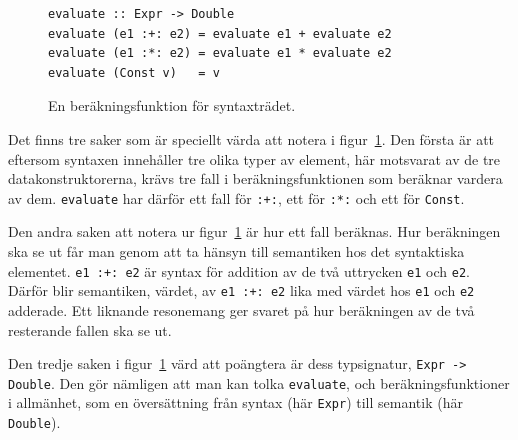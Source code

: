 \begin{draft}
\begin{figure}[tph]
  \begin{lstlisting}
evaluate :: Expr -> Double
evaluate (e1 :+: e2) = evaluate e1 + evaluate e2
evaluate (e1 :*: e2) = evaluate e1 * evaluate e2
evaluate (Const v)   = v
  \end{lstlisting}
  \caption{En beräkningsfunktion för syntaxträdet.}\label{fig:eval_tree}
\end{figure}

Det finns tre saker som är speciellt värda att notera i
figur~\ref{fig:eval_tree}. Den första är att eftersom syntaxen innehåller tre olika
typer av element, här motsvarat av de tre datakonstruktorerna, krävs tre fall i
beräkningsfunktionen som beräknar vardera av dem. \texttt{evaluate} har
därför ett fall för \texttt{:+:}, ett för \texttt{:*:} och ett för
\texttt{Const}. 

Den andra saken att notera ur figur~\ref{fig:eval_tree} är hur ett fall
beräknas. Hur beräkningen ska se ut får man genom att ta hänsyn till
semantiken hos det syntaktiska elementet. \texttt{e1 :+: e2} är syntax för
addition av de två uttrycken \texttt{e1} och \texttt{e2}. Därför blir
semantiken, värdet, av \texttt{e1 :+: e2} lika med värdet hos \texttt{e1} och
\texttt{e2} adderade. Ett liknande resonemang ger svaret på hur beräkningen av
de två resterande fallen ska se ut.

Den tredje saken i figur~\ref{fig:eval_tree} värd att poängtera är dess
typsignatur, \texttt{Expr -> Double}. Den gör nämligen att man kan tolka
\texttt{evaluate}, och beräkningsfunktioner i allmänhet, som en översättning
från syntax (här \texttt{Expr}) till semantik (här \texttt{Double}).

\end{draft}

